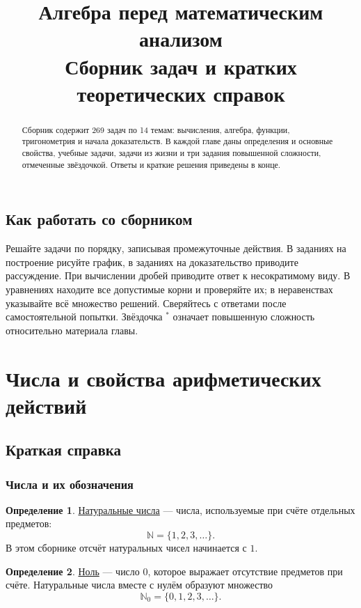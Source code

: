 \documentclass[12pt,a4paper]{article}
\title{Алгебра перед математическим анализом\\[8pt]\large Сборник задач и кратких теоретических справок}
\author{}
\date{}
\theoremstyle{definition}
\newtheorem{definition}{Определение}[section]
\theoremstyle{plain}
\theoremstyle{remark}
\newcommand{\term}[1]{\uline{#1}}
\newcommand{\starmark}{\ensuremath{{}^{\ast}}}
\begin{document}
\maketitle
\begin{abstract}
Сборник содержит 269 задач по 14 темам: вычисления, алгебра, функции, тригонометрия и начала доказательств. В каждой главе даны определения и основные свойства, учебные задачи, задачи из жизни и три задания повышенной сложности, отмеченные звёздочкой. Ответы и краткие решения приведены в конце.
\end{abstract}
\subsection*{Как работать со сборником}
Решайте задачи по порядку, записывая промежуточные действия. В заданиях на построение рисуйте график, в заданиях на доказательство приводите рассуждение. При вычислении дробей приводите ответ к несократимому виду. В уравнениях находите все допустимые корни и проверяйте их; в неравенствах указывайте всё множество решений. Сверяйтесь с ответами после самостоятельной попытки. Звёздочка \starmark{} означает повышенную сложность относительно материала главы.
\newpage
\tableofcontents
\newpage

\clearpage
\section{Числа и свойства арифметических действий}
\subsection*{Краткая справка}
\subsubsection*{Числа и их обозначения}

\begin{definition}
\term{Натуральные числа} --- числа, используемые при счёте отдельных предметов:
\[
\mathbb N=\{1,2,3,\ldots\}.
\]
В этом сборнике отсчёт натуральных чисел начинается с \(1\).
\end{definition}

\begin{definition}
\term{Ноль} --- число \(0\), которое выражает отсутствие предметов при счёте.
Натуральные числа вместе с нулём образуют множество
\[
\mathbb N_0=\{0,1,2,3,\ldots\}.
\]
\end{definition}
\end{document}
